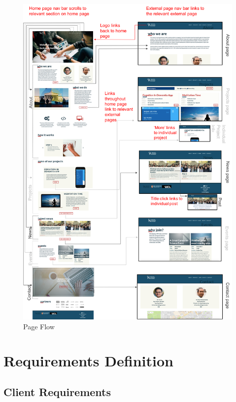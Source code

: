 \documentclass[fontsize=10pt]{extarticle}
\numberwithin{figure}{section} %
\begin{document}
\begin{figure}[H]
      \centering
      \includegraphics[trim = 0 0 0 0, clip, width=1\textwidth]{PageFlow.png}
      \caption{Page Flow}
      \label{PageFlow}
 \end{figure}

\newpage

\hypertarget{requirements-definition}{%
\section{Requirements Definition}\label{requirements-definition}}

\hypertarget{client-requirements}{%
\subsection{Client Requirements}\label{client-requirements}}
\end{document}

